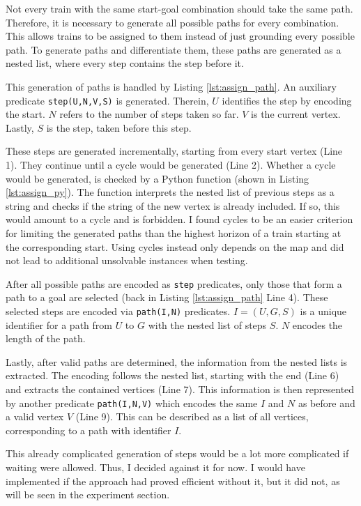 \documentclass{llncs}
\begin{document}
\begin{multicols*}{2}
Not every train with the same start-goal combination should take the same path. Therefore, it is necessary to generate all possible paths for every combination. This allows trains to be assigned to them instead of just grounding every possible path. To generate paths and differentiate them, these paths are generated as a nested list, where every step contains the step before it.

This generation of paths is handled by Listing \ref{lst:assign_path}. An auxiliary predicate \texttt{step(U,N,V,S)} is generated. Therein, $U$ identifies the step by encoding the start. $N$ refers to the number of steps taken so far. $V$ is the current vertex. Lastly, $S$ is the step, taken before this step.

These steps are generated incrementally, starting from every start vertex (Line 1). They continue until a cycle would be generated (Line 2). Whether a cycle would be generated, is checked by a Python function (shown in Listing \ref{lst:assign_py}). The function interprets the nested list of previous steps as a string and checks if the string of the new vertex is already included. If so, this would amount to a cycle and is forbidden. I found cycles to be an easier criterion for limiting the generated paths than the highest horizon of a train starting at the corresponding start. Using cycles instead only depends on the map and did not lead to additional unsolvable instances when testing.

After all possible paths are encoded as \texttt{step} predicates, only those that form a path to a goal are selected (back in Listing \ref{lst:assign_path} Line 4). These selected steps are encoded via \texttt{path(I,N)} predicates. $I=(U,G,S)$ is a unique identifier for a path from $U$ to $G$ with the nested list of steps $S$. $N$ encodes the length of the path.

Lastly, after valid paths are determined, the information from the nested lists is extracted. The encoding follows the nested list, starting with the end (Line 6) and extracts the contained vertices (Line 7). This information is then represented by another predicate \texttt{path(I,N,V)} which encodes the same $I$ and $N$ as before and a valid vertex $V$ (Line 9). This can be described as a list of all vertices, corresponding to a path with identifier $I$.

This already complicated generation of steps would be a lot more complicated if waiting were allowed. Thus, I decided against it for now. I would have implemented if the approach had proved efficient without it, but it did not, as will be seen in the experiment section.\\


\end{multicols*}
\end{document}

